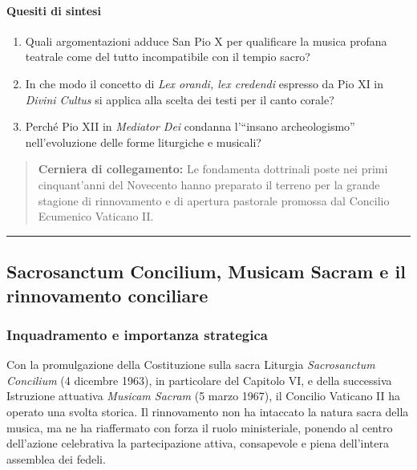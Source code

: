 \documentclass[12pt,a4paper]{article}
\begin{document}
	\paragraph{Quesiti di sintesi}\label{quesiti-di-sintesi}
	
	\begin{enumerate}[label=\arabic*.,leftmargin=*]
		\item Quali argomentazioni adduce San Pio X per qualificare la musica profana teatrale come del tutto incompatibile con il tempio sacro?
		\item In che modo il concetto di \emph{Lex orandi, lex credendi} espresso da Pio XI in \emph{Divini Cultus} si applica alla scelta dei testi per il canto corale?
		\item Perché Pio XII in \emph{Mediator Dei} condanna l'``insano archeologismo'' nell'evoluzione delle forme liturgiche e musicali?
	\end{enumerate}
	
	\begin{quote}
		\textbf{Cerniera di collegamento:} Le fondamenta dottrinali poste nei primi cinquant'anni del Novecento hanno preparato il terreno per la grande stagione di rinnovamento e di apertura pastorale promossa dal Concilio Ecumenico Vaticano II.
	\end{quote}
	
	\begin{center}\rule{0.5\linewidth}{0.5pt}\end{center}
	
	\subsection{Sacrosanctum Concilium, Musicam Sacram e il rinnovamento conciliare}\label{sacrosanctum-concilium-musicam-sacram-e-il-rinnovamento-conciliare}
	
	\subsubsection{Inquadramento e importanza strategica}\label{inquadramento-e-importanza-strategica-2}
	
	Con la promulgazione della Costituzione sulla sacra Liturgia \emph{Sacrosanctum Concilium} (4 dicembre 1963), in particolare del Capitolo VI, e della successiva Istruzione attuativa \emph{Musicam Sacram} (5 marzo 1967), il Concilio Vaticano II ha operato una svolta storica. Il rinnovamento non ha intaccato la natura sacra della musica, ma ne ha riaffermato con forza il ruolo ministeriale, ponendo al centro dell'azione celebrativa la partecipazione attiva, consapevole e piena dell'intera assemblea dei fedeli.
	
\end{document}
